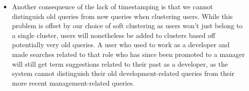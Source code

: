 \documentclass[a4paper]{article}
\begin{document}
\begin{itemize}
    \item   Another consequence of the lack of timestamping is that we cannot distinguish old queries from new queries when clustering users.
            While this problem is offset by our choice of soft clustering as users won't just belong to a single cluster, users will nonetheless be added to clusters based off potentially very old queries.
            A user who used to work as a developer and made searches related to that role who has since been promoted to a manager will still get term suggestions related to their past as a developer, as the system cannot distinguish their old development-related queries from their more recent management-related queries.
\end{itemize}

\end{document}
